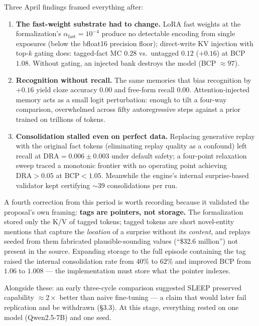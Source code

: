 \documentclass[11pt]{article}
\begin{document}
Three April findings framed everything after:

\begin{enumerate}
\item \textbf{The fast-weight substrate had to change.} LoRA fast weights at the formalization's
      $\alpha_{\mathrm{fast}} = 10^{-4}$ produce no detectable encoding from single exposures
      (below the bfloat16 precision floor); direct-write KV injection with top-$k$ gating does:
      tagged-fact MC $0.28$ vs.\ untagged $0.12$ ($+0.16$) at BCP $1.08$. Without gating, an
      injected bank destroys the model (BCP $\approx 97$).
\item \textbf{Recognition without recall.} The same memories that bias recognition by $+0.16$
      yield cloze accuracy $0.00$ and free-form recall $0.00$. Attention-injected memory acts as a
      small logit perturbation: enough to tilt a four-way comparison, overwhelmed across fifty
      autoregressive steps against a prior trained on trillions of tokens.
\item \textbf{Consolidation stalled even on perfect data.} Replacing generative replay with the
      original fact tokens (eliminating replay quality as a confound) left recall at
      $\mathrm{DRA} = 0.006 \pm 0.003$ under default safety; a four-point relaxation sweep traced
      a monotonic frontier with no operating point achieving $\mathrm{DRA} > 0.05$ at
      $\mathrm{BCP} < 1.05$. Meanwhile the engine's internal surprise-based validator kept
      certifying $\sim$39 consolidations per run.
\end{enumerate}

A fourth correction from this period is worth recording because it validated the proposal's own
framing: \textbf{tags are pointers, not storage.} The formalization stored only the K/V of tagged
tokens; tagged tokens are short novel-entity mentions that capture the \emph{location} of a
surprise without its \emph{content}, and replays seeded from them fabricated plausible-sounding
values (``\$32.6 million'') not present in the source. Expanding storage to the full episode
containing the tag raised the internal consolidation rate from $40\%$ to $62\%$ and improved BCP
from $1.06$ to $1.008$ --- the implementation must store what the pointer indexes.

Alongside these: an early three-cycle comparison suggested SLEEP preserved capability
$\approx 2\times$ better than naive fine-tuning --- a claim that would later fail replication and
be withdrawn (\S3.3). At this stage, everything rested on one model (Qwen2.5-7B) and one seed.
\end{document}
